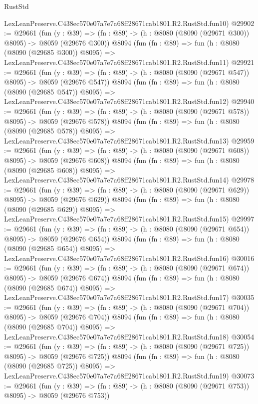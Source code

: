 \begin{lexlean}{RustStd}
\begin{coremodule}
    LexLeanPreserve.C438ec570e07a7e7a68ff28671cab1801.R2.RustStd.fun10)
@29902 := @29661
    (fun (y : @39) => (fn : @89) -> (h : @8080 (@8090 (@29671 @300)) @8095) -> @8059 (@29676 @300))
    @8094
    (fun (fn : @89) =>
    fun (h : @8080 (@8090 (@29685 @300)) @8095) =>
    LexLeanPreserve.C438ec570e07a7e7a68ff28671cab1801.R2.RustStd.fun11)
@29921 := @29661
    (fun (y : @39) => (fn : @89) -> (h : @8080 (@8090 (@29671 @547)) @8095) -> @8059 (@29676 @547))
    @8094
    (fun (fn : @89) =>
    fun (h : @8080 (@8090 (@29685 @547)) @8095) =>
    LexLeanPreserve.C438ec570e07a7e7a68ff28671cab1801.R2.RustStd.fun12)
@29940 := @29661
    (fun (y : @39) => (fn : @89) -> (h : @8080 (@8090 (@29671 @578)) @8095) -> @8059 (@29676 @578))
    @8094
    (fun (fn : @89) =>
    fun (h : @8080 (@8090 (@29685 @578)) @8095) =>
    LexLeanPreserve.C438ec570e07a7e7a68ff28671cab1801.R2.RustStd.fun13)
@29959 := @29661
    (fun (y : @39) => (fn : @89) -> (h : @8080 (@8090 (@29671 @608)) @8095) -> @8059 (@29676 @608))
    @8094
    (fun (fn : @89) =>
    fun (h : @8080 (@8090 (@29685 @608)) @8095) =>
    LexLeanPreserve.C438ec570e07a7e7a68ff28671cab1801.R2.RustStd.fun14)
@29978 := @29661
    (fun (y : @39) => (fn : @89) -> (h : @8080 (@8090 (@29671 @629)) @8095) -> @8059 (@29676 @629))
    @8094
    (fun (fn : @89) =>
    fun (h : @8080 (@8090 (@29685 @629)) @8095) =>
    LexLeanPreserve.C438ec570e07a7e7a68ff28671cab1801.R2.RustStd.fun15)
@29997 := @29661
    (fun (y : @39) => (fn : @89) -> (h : @8080 (@8090 (@29671 @654)) @8095) -> @8059 (@29676 @654))
    @8094
    (fun (fn : @89) =>
    fun (h : @8080 (@8090 (@29685 @654)) @8095) =>
    LexLeanPreserve.C438ec570e07a7e7a68ff28671cab1801.R2.RustStd.fun16)
@30016 := @29661
    (fun (y : @39) => (fn : @89) -> (h : @8080 (@8090 (@29671 @674)) @8095) -> @8059 (@29676 @674))
    @8094
    (fun (fn : @89) =>
    fun (h : @8080 (@8090 (@29685 @674)) @8095) =>
    LexLeanPreserve.C438ec570e07a7e7a68ff28671cab1801.R2.RustStd.fun17)
@30035 := @29661
    (fun (y : @39) => (fn : @89) -> (h : @8080 (@8090 (@29671 @704)) @8095) -> @8059 (@29676 @704))
    @8094
    (fun (fn : @89) =>
    fun (h : @8080 (@8090 (@29685 @704)) @8095) =>
    LexLeanPreserve.C438ec570e07a7e7a68ff28671cab1801.R2.RustStd.fun18)
@30054 := @29661
    (fun (y : @39) => (fn : @89) -> (h : @8080 (@8090 (@29671 @725)) @8095) -> @8059 (@29676 @725))
    @8094
    (fun (fn : @89) =>
    fun (h : @8080 (@8090 (@29685 @725)) @8095) =>
    LexLeanPreserve.C438ec570e07a7e7a68ff28671cab1801.R2.RustStd.fun19)
@30073 := @29661
    (fun (y : @39) => (fn : @89) -> (h : @8080 (@8090 (@29671 @753)) @8095) -> @8059 (@29676 @753))

\end{coremodule}
\end{lexlean}
